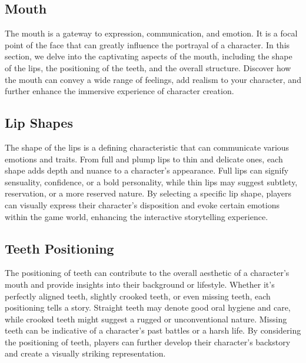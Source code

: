 \documentclass[12pt]{book}  %
\begin{document}
\subsection{\textbf{Mouth}}

The mouth is a gateway to expression, communication, and emotion. It is a focal point of the face that can greatly influence the portrayal of a character. In this section, we delve into the captivating aspects of the mouth, including the shape of the lips, the positioning of the teeth, and the overall structure. Discover how the mouth can convey a wide range of feelings, add realism to your character, and further enhance the immersive experience of character creation.

\subsection{\textbf{Lip Shapes}}

The shape of the lips is a defining characteristic that can communicate various emotions and traits. From full and plump lips to thin and delicate ones, each shape adds depth and nuance to a character's appearance. Full lips can signify sensuality, confidence, or a bold personality, while thin lips may suggest subtlety, reservation, or a more reserved nature. By selecting a specific lip shape, players can visually express their character's disposition and evoke certain emotions within the game world, enhancing the interactive storytelling experience.

\subsection{\textbf{Teeth Positioning}}

The positioning of teeth can contribute to the overall aesthetic of a character's mouth and provide insights into their background or lifestyle. Whether it's perfectly aligned teeth, slightly crooked teeth, or even missing teeth, each positioning tells a story. Straight teeth may denote good oral hygiene and care, while crooked teeth might suggest a rugged or unconventional nature. Missing teeth can be indicative of a character's past battles or a harsh life. By considering the positioning of teeth, players can further develop their character's backstory and create a visually striking representation.
\end{document}
